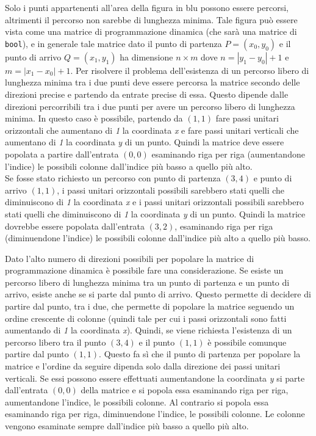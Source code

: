 \documentclass[a4paper,11pt]{article}
\begin{document}
Solo i punti appartenenti all'area della figura in blu possono essere percorsi, altrimenti il percorso non sarebbe di lunghezza minima. Tale figura può essere vista come una matrice di programmazione dinamica (che sarà una matrice di \texttt{bool}), e in generale tale matrice dato il punto di partenza $P = (x_0, y_0)$ e il punto di arrivo $Q = (x_1, y_1)$ ha dimensione $n \times m$ dove $n = |y_1 - y_0| + 1$ e $m = |x_1 - x_0| +1$. Per risolvere il problema dell'esistenza di un percorso libero di lunghezza minima tra i due punti deve essere percorsa la matrice secondo delle direzioni precise e partendo da entrate precise di essa. Questo dipende dalle direzioni percorribili tra i due punti per avere un percorso libero di lunghezza minima. In questo caso è possibile, partendo da $(1, 1)$ fare passi unitari orizzontali che aumentano di \textit{1} la coordinata \textit{x} e fare passi unitari verticali che aumentano di \textit{1} la coordinata \textit{y} di un punto. Quindi la matrice deve essere popolata a partire dall'entrata $(0, 0)$ esaminando riga per riga (aumentandone l'indice) le possibili colonne dall'indice più basso a quello più alto. \\
Se fosse stato richiesto un percorso con punto di partenza $(3, 4)$ e punto di arrivo $(1, 1)$, i passi unitari orizzontali possibili sarebbero stati quelli che diminuiscono di \textit{1} la coordinata \textit{x} e i passi unitari orizzontali possibili sarebbero stati quelli che diminuiscono di \textit{1} la coordinata \textit{y} di un punto. Quindi la matrice dovrebbe essere popolata dall'entrata $(3, 2)$, esaminando riga per riga (diminuendone l'indice) le possibili colonne dall'indice più alto a quello più basso. 

Dato l'alto numero di direzioni possibili per popolare la matrice di programmazione dinamica è possibile fare una considerazione. Se esiste un percorso libero di lunghezza minima tra un punto di partenza e un punto di arrivo, esiste anche se si parte dal punto di arrivo. Questo permette di decidere di partire dal punto, tra i due, che permette di popolare la matrice seguendo un ordine crescente di colonne (quindi tale per cui i passi orizzontali sono fatti aumentando di \textit{1} la coordinata \textit{x}). Quindi, se viene richiesta l'esistenza di un percorso libero tra il punto $(3, 4)$ e il punto $(1, 1)$ è possibile comunque partire dal punto $(1, 1)$. Questo fa sì che il punto di partenza per popolare la matrice e l'ordine da seguire dipenda solo dalla direzione dei passi unitari verticali. Se essi possono essere effettuati aumentandone la coordinata \textit{y} si parte dall'entrata $(0, 0)$ della matrice e si popola essa esaminando riga per riga, aumentandone l'indice, le possibili colonne. Al contrario si popola essa esaminando riga per riga, diminuendone l'indice, le possibili colonne. Le colonne vengono esaminate sempre dall'indice più basso a quello più alto. 
\end{document}
